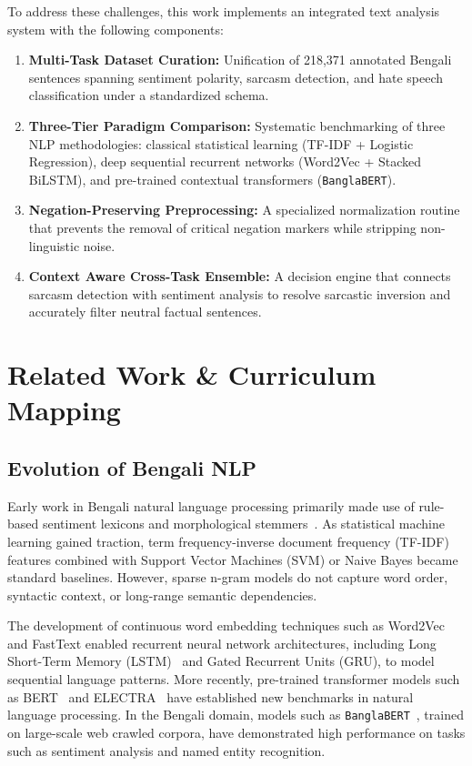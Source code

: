 \documentclass[11pt,a4paper]{article}
\begin{document}
To address these challenges, this work implements an integrated text analysis system with the following components:
\begin{enumerate}[leftmargin=*]
    \item \textbf{Multi-Task Dataset Curation:} Unification of 218,371 annotated Bengali sentences spanning sentiment polarity, sarcasm detection, and hate speech classification under a standardized schema.
    \item \textbf{Three-Tier Paradigm Comparison:} Systematic benchmarking of three NLP methodologies: classical statistical learning (TF-IDF + Logistic Regression), deep sequential recurrent networks (Word2Vec + Stacked BiLSTM), and pre-trained contextual transformers (\texttt{BanglaBERT}).
    \item \textbf{Negation-Preserving Preprocessing:} A specialized normalization routine that prevents the removal of critical negation markers while stripping non-linguistic noise.
    \item \textbf{Context Aware Cross-Task Ensemble:} A decision engine that connects sarcasm detection with sentiment analysis to resolve sarcastic inversion and accurately filter neutral factual sentences.
\end{enumerate}

\section{Related Work \& Curriculum Mapping}
\subsection{Evolution of Bengali NLP}
Early work in Bengali natural language processing primarily made use of rule-based sentiment lexicons and morphological stemmers~\cite{das2010sentiwordnet}. As statistical machine learning gained traction, term frequency-inverse document frequency (TF-IDF) features combined with Support Vector Machines (SVM) or Naive Bayes became standard baselines. However, sparse n-gram models do not capture word order, syntactic context, or long-range semantic dependencies.

The development of continuous word embedding techniques such as Word2Vec~\cite{mikolov2013word2vec} and FastText enabled recurrent neural network architectures, including Long Short-Term Memory (LSTM)~\cite{hochreiter1997long} and Gated Recurrent Units (GRU), to model sequential language patterns. More recently, pre-trained transformer models such as BERT~\cite{devlin2019bert} and ELECTRA~\cite{clark2020electra} have established new benchmarks in natural language processing. In the Bengali domain, models such as \texttt{BanglaBERT}~\cite{alam2021banglabert}, trained on large-scale web crawled corpora, have demonstrated high performance on tasks such as sentiment analysis and named entity recognition.
\end{document}
